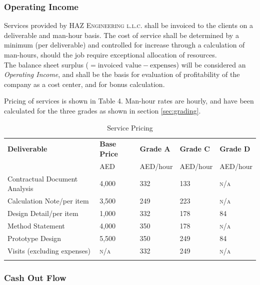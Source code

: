 \documentclass[a4paper,oneside,12pt,final]{article}
\begin{document}
\subsubsection{Operating Income}

Services provided by \textsc{HAZ Engineering l.l.c.} shall be invoiced to the clients on a deliverable and man-hour basis. The cost of service shall be determined by a minimum (per deliverable) and controlled for increase through a calculation of man-hours, should the job require exceptional allocation of resources.\\

The balance sheet surplus ($=\text{invoiced value} -\text{expenses}$) will be considered an \emph{Operating Income}, and shall be the basis for evaluation of profitability of the company as a cost center, and for bonus calculation.

Pricing of services is shown in Table 4. Man-hour rates are hourly, and have been calculated for the three grades as shown in section \ref{sec:grading}.

\begin{table}[h]
	\centering
	\begin{tabular}{lllll}
	\toprule
	\textbf{Deliverable}&\textbf{Base Price}&\textbf{Grade A}&\textbf{Grade C}&\textbf{Grade D}\\
	&\footnotesize AED&\footnotesize AED/hour&\footnotesize AED/hour&\footnotesize AED/hour \vspace{0.2cm}\\ 
	\midrule
	\normalsize
	Contractual Document Analysis&4,000&332&133&\textsc{n/a}\\
	Calculation Note\footnotesize/per item&3,500&249&223&\textsc{n/a}\\
	Design Detail\footnotesize/per item&1,000&332&178&84\\
	Method Statement&4,000&350&178&\textsc{n/a}\\
	Prototype Design&5,500&350&249&84\\
	Visits \footnotesize (excluding expenses)&\textsc{n/a}&332&249&\textsc{n/a}\\
	\bottomrule
	\label{tab:serviceprice}
	\end{tabular}
	\caption{Service Pricing}
\end{table}

\newpage
\subsubsection{Cash Out Flow}
\label{sec:cashflow}
\end{document}

